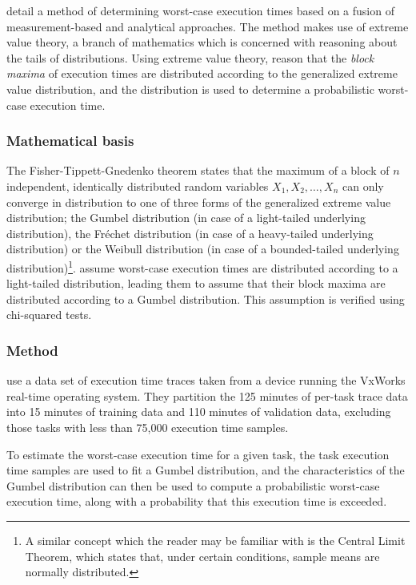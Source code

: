 \textcite{hansen_et_al:wcet} detail a method of determining worst-case execution times based on a fusion of measurement-based and analytical approaches. The method makes use of extreme value theory, a branch of mathematics which is concerned with reasoning about the tails of distributions. Using extreme value theory, \citeauthor*{hansen_et_al:wcet} reason that the \emph{block maxima} of execution times are distributed according to the generalized extreme value distribution, and the distribution is used to determine a probabilistic worst-case execution time.

\subsubsection{Mathematical basis}

The Fisher-Tippett-Gnedenko theorem states that the maximum of a block of $n$ independent, identically distributed random variables $X_1, X_2, \ldots, X_n$ can only converge in distribution to one of three forms of the generalized extreme value distribution; the Gumbel distribution (in case of a light-tailed underlying distribution), the Fréchet distribution (in case of a heavy-tailed underlying distribution) or the Weibull distribution (in case of a bounded-tailed underlying distribution)\footnote{A similar concept which the reader may be familiar with is the Central Limit Theorem, which states that, under certain conditions, sample means are normally distributed.}. \citeauthor*{hansen_et_al:wcet} assume worst-case execution times are distributed according to a light-tailed distribution, leading them to assume that their block maxima are distributed according to a Gumbel distribution. This assumption is verified using chi-squared tests.

\subsubsection{Method}

\citeauthor*{hansen_et_al:wcet} use a data set of execution time traces taken from a device running the VxWorks real-time operating system. They partition the 125 minutes of per-task trace data into 15 minutes of training data and 110 minutes of validation data, excluding those tasks with less than 75,000 execution time samples.

To estimate the worst-case execution time for a given task, the task execution time samples are used to fit a Gumbel distribution, and the characteristics of the Gumbel distribution can then be used to compute a probabilistic worst-case execution time, along with a probability that this execution time is exceeded.

